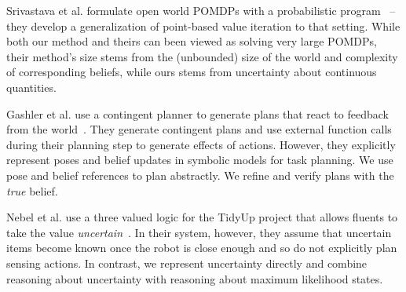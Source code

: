 Srivastava et al. formulate open world POMDPs with a probabilistic
program~\cite{srivastava2014first} -- they develop a generalization of
point-based value iteration to that setting. While both our method and
theirs can been viewed as solving very large POMDPs, their method's size stems from
the (unbounded) size of the world and complexity of corresponding
beliefs, while ours stems from uncertainty about continuous quantities.


Gashler et al. use a contingent planner to generate plans that react
to feedback from the world~\cite{gaschler2013kvp}. They generate
contingent plans and use external function calls during their planning
step to generate effects of actions. However, they explicitly
represent poses and belief updates in symbolic models for task
planning. We use pose and belief references to plan abstractly. We
refine and verify plans with the \emph{true} belief.

Nebel et al. use a three valued logic for the TidyUp project that
allows fluents to take the value
\emph{uncertain}~\cite{nebel13aaaiirs}. In their system, however, they
assume that uncertain items become known once the robot is close
enough and so do not explicitly plan sensing actions. In contrast, we
represent uncertainty directly and combine
reasoning about uncertainty with reasoning about maximum likelihood
states.


